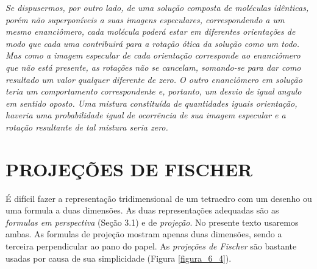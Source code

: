 \emph{Se dispusermos, por outro lado, de uma solução composta de moléculas idênticas, porém não superponíveis a suas imagens especulares, correspondendo a um mesmo enanciômero, cada molécula poderá estar em diferentes orientações de modo que cada uma contribuirá para a rotação ótica da solução como um todo. Mas como a imagem especular de cada orientação corresponde ao enanciômero que não está presente, as rotações não se cancelam, somando-se para dar como resultado um valor qualquer diferente de zero. O outro enanciômero em solução teria um comportamento correspondente e, portanto, um desvio de igual angulo em sentido oposto. Uma mistura constituída de quantidades iguais orientação, haveria uma probabilidade igual de ocorrência de sua imagem especular e a rotação resultante de tal mistura seria zero.}

\section{PROJEÇÕES DE FISCHER}

É difícil fazer a representação tridimensional de um tetraedro com um desenho ou uma formula a duas dimensões. As duas representações adequadas são as \textit{formulas em perspectiva} (Seção 3.1) e de \textit{projeção}. No presente texto usaremos ambas. As formulas de projeção mostram apenas duas dimensões, sendo a terceira perpendicular ao pano do papel. As \textit{projeções de Fischer} são bastante usadas por causa de sua simplicidade (Figura \ref{figura_6_4}).

